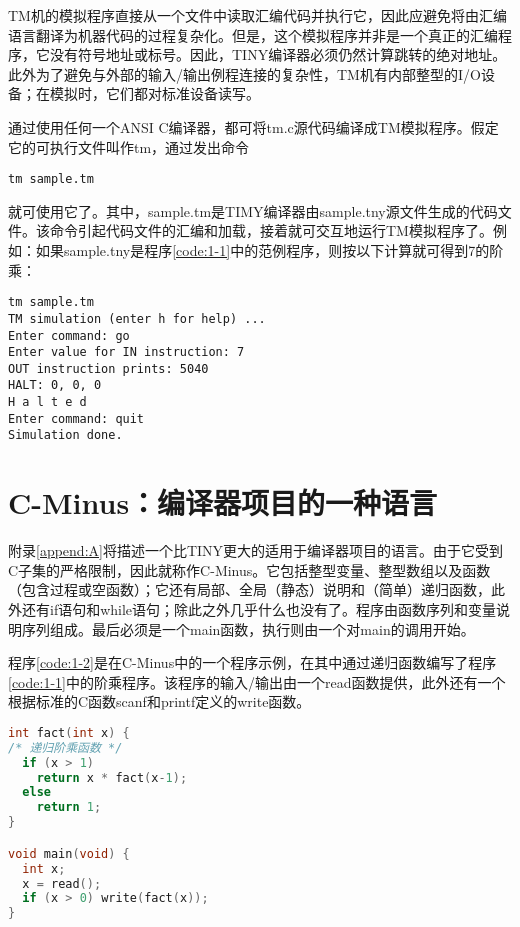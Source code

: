 \documentclass[lang=cn,10pt]{elegantbook}
\begin{document}
TM机的模拟程序直接从一个文件中读取汇编代码并执行它，因此应避免将由汇编语言翻译为机器代码的过程复杂化。但是，这个模拟程序并非是一个真正的汇编程序，它没有符号地址或标号。因此，TINY编译器必须仍然计算跳转的绝对地址。此外为了避免与外部的输入/输出例程连接的复杂性，TM机有内部整型的I/O设备；在模拟时，它们都对标准设备读写。

通过使用任何一个ANSI C编译器，都可将tm.c源代码编译成TM模拟程序。假定它的可执行文件叫作tm，通过发出命令

\begin{lstlisting}
tm sample.tm
\end{lstlisting}

就可使用它了。其中，sample.tm是TIMY编译器由sample.tny源文件生成的代码文件。该命令引起代码文件的汇编和加载，接着就可交互地运行TM模拟程序了。例如：如果sample.tny是程序\ref{code:1-1}中的范例程序，则按以下计算就可得到7的阶乘：

\begin{lstlisting}
tm sample.tm
TM simulation (enter h for help) ...
Enter command: go
Enter value for IN instruction: 7
OUT instruction prints: 5040
HALT: 0, 0, 0
H a l t e d
Enter command: quit
Simulation done.
\end{lstlisting}

\section{C-Minus：编译器项目的一种语言}
\label{sec:1-8}

附录\ref{append:A}将描述一个比TINY更大的适用于编译器项目的语言。由于它受到C子集的严格限制，因此就称作C-Minus。它包括整型变量、整型数组以及函数（包含过程或空函数）；它还有局部、全局（静态）说明和（简单）递归函数，此外还有if语句和while语句；除此之外几乎什么也没有了。程序由函数序列和变量说明序列组成。最后必须是一个main函数，执行则由一个对main的调用开始。

程序\ref{code:1-2}是在C-Minus中的一个程序示例，在其中通过递归函数编写了程序\ref{code:1-1}中的阶乘程序。该程序的输入/输出由一个read函数提供，此外还有一个根据标准的C函数scanf和printf定义的write函数。

\begin{lstlisting}[caption={一个以其输入的阶乘为输出的C-Minus程序},label={code:1-2},language=c]
int fact(int x) {
/* 递归阶乘函数 */
  if (x > 1)
    return x * fact(x-1);
  else
    return 1;
}

void main(void) {
  int x;
  x = read();
  if (x > 0) write(fact(x));
}
\end{lstlisting}
\end{document}
